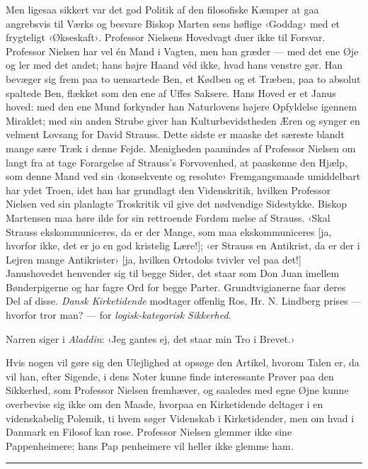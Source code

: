 \documentclass[12pt,a4paper,openany]{book}
\newcommand{\piecerule}{\par\begin{center}\rule{1.5cm}{0.4pt}\end{center}\par}
\newcommand{\opage}[1]{\marginnote{\footnotesize\textit{[#1]}}}
\begin{document}
Men ligesaa sikkert var det god Politik af den filosofiske
Kæmper at gaa angrebsvis til Værks og besvare Biskop Marten\-%
sens høflige ‹Goddag› med et frygteligt ‹Økseskaft›. Professor
Nielsens Hovedvagt duer ikke til Forsvar. Professor Nielsen
har vel én Mand i Vagten, men han græder --- med det ene
Øje og ler med det andet; hans højre Haand véd ikke, hvad
hans venstre gør. Han bevæger sig frem paa to uensartede
Ben, et Kødben og et Træben, paa to absolut spaltede Ben,
flækket som den ene af Uffes Saksere. Hans Hoved er et Janus\-%
hoved: med den ene Mund forkynder han Naturlovens højere
Opfyldelse igennem Miraklet; med sin anden Strube giver han
Kulturbevidstheden Æren og synger en velment Lovsang for
David Strauss. Dette sidste er maaske det særeste blandt mange
sære Træk i denne Fejde. Menigheden paamindes af Professor
Nielsen om langt fra at tage Forargelse af Strauss's Forvovenhed,
at paaskønne den Hjælp, som denne Mand ved sin ‹konsekvente
og resolute› Fremgangsmaade umiddelbart har ydet Troen, idet
han har grundlagt den Videnskritik, hvilken Professor Nielsen
ved sin planlagte Troskritik vil give det nødvendige Sidestykke.
Biskop Martensen maa høre ilde for sin rettroende Fordøm\-%
melse af Strauss. ‹Skal Strauss ekskommuniceres, da er der
Mange, som maa ekskommuniceres [ja, hvorfor ikke, det er jo
en god kristelig Lære!]; ‹er Strauss en Antikrist, da er der i
Lejren mange Antikrister› [ja, hvilken Ortodoks tvivler vel paa
det!] Janushovedet henvender sig til begge Sider, det staar
som Don Juan imellem Bønderpigerne og har fagre Ord for
\opage{92}begge Parter. Grundtvigianerne faar deres Del af disse. \emph{Dansk
Kirketidende} modtager offenlig Ros, Hr. N. Lindberg prises ---
hvorfor tror man? --- for \emph{logisk-kategorisk Sikkerhed}.

Narren siger i \emph{Aladdin}: ‹Jeg gantes ej, det staar min Tro
i Brevet.›

Hvis nogen vil gøre sig den Ulejlighed at opsøge den
Artikel, hvorom Talen er, da vil han, efter Sigende, i dens
Noter kunne finde interessante Prøver paa den Sikkerhed, som
Professor Nielsen fremhæver, og saaledes med egne Øjne kunne
overbevise sig ikke om den Maade, hvorpaa en Kirketidende
deltager i en videnskabelig Polemik, ti hvem søger Videnskab i
Kirketidender, men om hvad i Danmark en Filosof kan rose.
Professor Nielsen glemmer ikke sine Pappenheimere; hans Pap\-%
penheimere vil heller ikke glemme ham.
\piecerule
\end{document}

